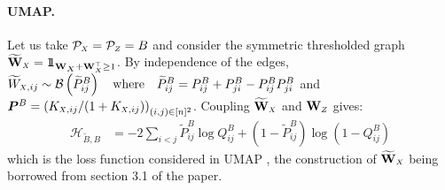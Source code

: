 \paragraph{UMAP.}
Let us take $\mathcal{P}_{\scaleto{X}{4pt}} = \mathcal{P}_{\scaleto{Z}{4pt}} = B$ and consider the symmetric thresholded graph $\widetilde{\W}_{\scaleto{X}{4pt}} = \ind_{\W_{\scaleto{X}{4pt}} + \W_X^\top \geq 1}$. By independence of the edges, $\widetilde{W}_{\scaleto{X}{4pt},ij} \sim \mathcal{B}\left(\widetilde{P}^{B}_{ij} \right) \quad \text{where} \quad  \widetilde{P}^{B}_{ij} = P^{B}_{ij} + P^{B}_{ji} - P^{B}_{ij} P^{B}_{ji}$ and $\bm{P}^{B} = \left( K_{\scaleto{X}{4pt},ij} / (1+K_{\scaleto{X}{4pt},ij}) \right)_{(i,j) \in [n]^2}$. Coupling $\widetilde{\W}_{\scaleto{X}{4pt}}$ and $\W_{\scaleto{Z}{4pt}}$ gives:
\begin{align*}
    \mathcal{H}_{\widetilde{B},B} &= -2 \sum_{i<j} \widetilde{P}_{ij}^{B} \log Q_{ij}^{B} + \left(1 - \widetilde{P}_{ij}^{B} \right) \log \left( 1 - Q_{ij}^{B} \right)
\end{align*}
which is the loss function considered in UMAP \cite{mcinnes2018umap}, the construction of $\widetilde{\W}_{\scaleto{X}{4pt}}$ being borrowed from section 3.1 of the paper.


